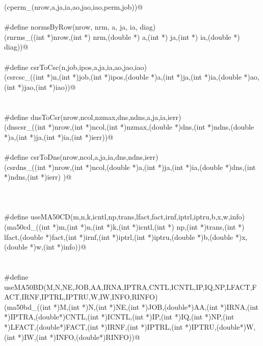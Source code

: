 \documentclass[12pt]{article}
\begin{document}
\begin{flushleft}
\begin{minipage}{\linewidth}
\begin{list}{}{}
\mbox{}\verb@(cperm_(nrow,a,ja,ia,ao,jao,iao,perm,job))@\\
\mbox{}\verb@@\\
\mbox{}\verb@#define normsByRow(nrow, nrm, a, ja, ia, diag) \@\\
\mbox{}\verb@(rnrms_((int *)nrow,(int *) nrm,(double *) a,(int *) ja,(int *) ia,(double *) diag))@\\
\mbox{}\verb@@\\
\mbox{}\verb@#define csrToCsc(n,job,ipos,a,ja,ia,ao,jao,iao) \@\\
\mbox{}\verb@ (csrcsc_((int *)n,(int *)job,(int *)ipos,(double *)a,(int *)ja,(int *)ia,(double *)ao,(int *)jao,(int *)iao))@\\
\mbox{}\verb@@\\
\mbox{}\verb@@\\
\mbox{}\verb@#define dnsToCsr(nrow,ncol,nzmax,dns,ndns,a,ja,ia,ierr)\@\\
\mbox{}\verb@(dnscsr_((int *)nrow,(int *)ncol,(int *)nzmax,(double *)dns,(int *)ndns,(double *)a,(int *)ja,(int *)ia,(int *)ierr))@\\
\mbox{}\verb@@\\
\mbox{}\verb@#define csrToDns(nrow,ncol,a,ja,ia,dns,ndns,ierr) \@\\
\mbox{}\verb@(csrdns_((int *)nrow,(int *)ncol,(double *)a,(int *)ja,(int *)ia,(double *)dns,(int *)ndns,(int *)ierr) )@\\
\mbox{}\verb@@\\
\mbox{}\verb@@\\
\mbox{}\verb@@\\
\mbox{}\verb@#define useMA50CD(m,n,k,icntl,np,trans,lfact,fact,irnf,iptrl,iptru,b,x,w,info)\@\\
\mbox{}\verb@(ma50cd_((int *)m,(int *)n,(int *)k,(int *)icntl,(int *) np,(int *)trans,(int *) lfact,(double *)fact,(int *)irnf,(int *)iptrl,(int *)iptru,(double *)b,(double *)x,(double *)w,(int *)info))@\\
\mbox{}\verb@@\\
\mbox{}\verb@@\\
\mbox{}\verb@#define useMA50BD(M,N,NE,JOB,AA,IRNA,IPTRA,CNTL,ICNTL,IP,IQ,NP,LFACT,FACT,IRNF,IPTRL,IPTRU,W,IW,INFO,RINFO)\@\\
\mbox{}\verb@(ma50bd_((int *)M,(int *)N,(int *)NE,(int *)JOB,(double*)AA,(int *)IRNA,(int *)IPTRA,(double*)CNTL,(int *)ICNTL,(int *)IP,(int *)IQ,(int *)NP,(int *)LFACT,(double*)FACT,(int *)IRNF,(int *)IPTRL,(int *)IPTRU,(double*)W,(int *)IW,(int *)INFO,(double*)RINFO))@\\

\end{list}
\end{minipage}
\end{flushleft}
\end{document}
